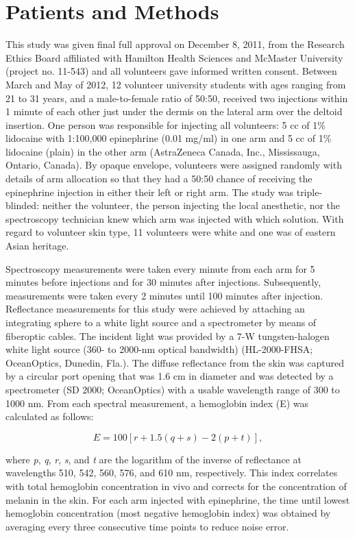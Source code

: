 \section{Patients and Methods}
This study was given final full approval on December 8, 2011, from the Research Ethics Board affiliated with Hamilton Health Sciences and McMaster University (project no. 11-543) and all volunteers gave informed written consent. Between March and May of 2012, 12 volunteer university students with ages ranging from 21 to 31 years, and a male-to-female ratio of 50:50, received two injections within 1 minute of each other just under the dermis on the lateral arm over the deltoid insertion. One person was responsible for injecting all volunteers: 5 cc of 1\% lidocaine with 1:100,000 epinephrine (0.01 mg/ml) in one arm and 5 cc of 1\% lidocaine (plain) in the other arm (AstraZeneca Canada, Inc., Mississauga, Ontario, Canada). By opaque envelope, volunteers were assigned randomly with details of arm allocation so that they had a 50:50 chance of receiving the epinephrine injection in either their left or right arm. The study was triple-blinded: neither the volunteer, the person injecting the local anesthetic, nor the spectroscopy technician knew which arm was injected with which solution. With regard to volunteer skin type, 11 volunteers were white and one was of eastern Asian heritage.

Spectroscopy measurements were taken every minute from each arm for 5 minutes before injections and for 30 minutes after injections. Subsequently, measurements were taken every 2 minutes until 100 minutes after injection. Reflectance measurements for this study were achieved by attaching an integrating sphere to a white light source and a spectrometer by means of fiberoptic cables. The incident light was provided by a 7-W tungsten-halogen white light source (360- to 2000-nm optical bandwidth) (HL-2000-FHSA; OceanOptics, Dunedin, Fla.). The diffuse reflectance from the skin was captured by a circular port opening that was 1.6 cm in diameter and was detected by a spectrometer (SD 2000; OceanOptics) with a usable wavelength range of 300 to 1000 nm. From each spectral measurement, a hemoglobin index (E) was calculated as follows\cite{Dawson1980}:

\begin{equation}
E = 100[r+1.5(q+s)-2(p+t)],
\end{equation}

where \emph{p}, \emph{q}, \emph{r}, \emph{s}, and \emph{t} are the logarithm of the inverse of reflectance at wavelengths 510, 542, 560, 576, and 610 nm, respectively. This index correlates with total hemoglobin concentration in vivo and corrects for the concentration of melanin in the skin. For each arm injected with epinephrine, the time until lowest hemoglobin concentration (most negative hemoglobin index) was obtained by averaging every three consecutive time points to reduce noise error.

